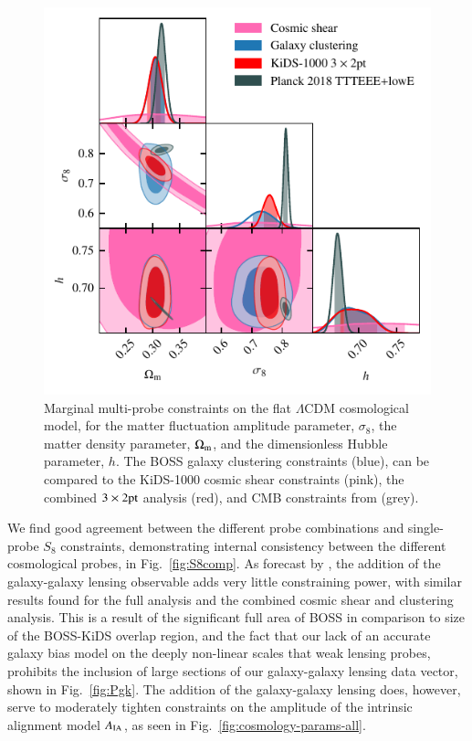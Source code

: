 \begin{figure}
	\begin{center}
		\includegraphics[width=\columnwidth]{Parameter_Plots/cosmology/omegam_sigma8_h_blind_C}
		\caption{Marginal multi-probe constraints on the flat $\Lambda$CDM cosmological model, for the matter fluctuation amplitude parameter, $\sigma_8$, the matter density parameter, $\Omega_{\rm m}$, and the dimensionless Hubble parameter, $h$.  The BOSS galaxy clustering constraints (blue), can be compared to the KiDS-1000 cosmic shear constraints (pink), the combined $3\times2{\rm pt}$ analysis (red), and CMB constraints from \citet{planck/etal:2018} (grey).}
		\label{fig:cosmology-params}
	\end{center}
\end{figure}

We find good agreement between the different probe combinations and single-probe $S_8$ constraints, demonstrating internal consistency between the different cosmological probes, in Fig.~\ref{fig:S8comp}.  
As forecast by \citet{joachimi/etal:inprep}, the addition of the galaxy-galaxy lensing observable adds very little constraining power, with similar results found for the full \tttp analysis and the combined cosmic shear and clustering analysis. 
This is a result of the significant full area of BOSS in comparison to size of the BOSS-KiDS overlap region, and the fact that our lack of an accurate galaxy bias model on the deeply non-linear scales that weak lensing probes,
prohibits the inclusion of large sections of our galaxy-galaxy lensing data vector, shown in Fig.~\ref{fig:Pgk}.  
The addition of the galaxy-galaxy lensing does, however, serve to moderately tighten constraints on the amplitude of the intrinsic alignment model $A_{\rm IA}$,  as seen in Fig.~\ref{fig:cosmology-params-all}. 

